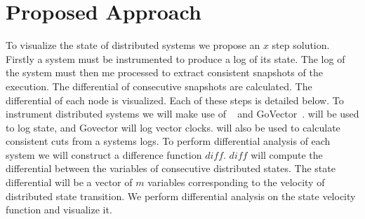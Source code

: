 \section{Proposed Approach}
\label{sec:proposed-approach}

To visualize the state of distributed systems we propose an $x$ step solution.
Firstly a system must be instrumented to produce a log of its state. The log of
the system must then me processed to extract consistent snapshots of the
execution. The differential of consecutive snapshots are calculated. The
differential of each node is visualized. Each of these steps is detailed below.
To instrument distributed systems we will make use of \dinv~\cite{dinv} and
GoVector~\cite{govector}. \dinv will be used to log state, and Govector will
log vector clocks. \dinv will also be used to calculate consistent cuts from a
systems logs. To perform differential analysis of each system we will construct
a difference function $diff$. $diff$ will compute the differential between the
variables of consecutive distributed states. The state differential will be a
vector of $m$ variables corresponding to the velocity of distributed state
transition. We perform differential analysis on the state velocity function and
visualize it.
